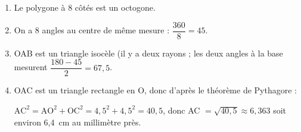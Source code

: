 
\medskip  

%
%
\begin{enumerate}
\item Le polygone à 8 côtés est un octogone.
\item On a 8 angles au centre de même mesure : $\dfrac{360}{8} = 45$\degres.
\item OAB est un triangle isocèle (il y a deux rayons  ; les deux angles à la base mesurent $\dfrac{180 - 45}{2} = 67,5$\degres.
\item OAC est un triangle rectangle en O, donc d'après le théorème de Pythagore :

$\text{AC}^2 = \text{AO}^2 + \text{OC}^2 = 4,5^2 + 4,5^2 = 40,5$, donc AC $ = \sqrt{40,5} \approx 6,363$ soit environ 6,4~cm au millimètre près.
\end{enumerate}

\vspace{0,5cm}

